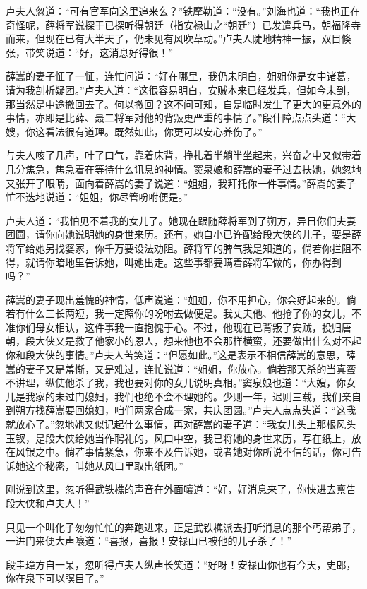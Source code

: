 \documentclass[12pt,oneside]{book}
\begin{document}
卢夫人忽道：``可有官军向这里追来么？''铁摩勒道：``没有。''刘海也道：``我也正在奇怪呢，薛将军说探于已探听得朝廷（指安禄山之``朝廷''）已发遣兵马，朝福隆寺而来，但现在已有大半天了，仍未见有风吹草动。''卢夫人陡地精神一振，双目倏张，带笑说道：``好，这消息好得很！''

薛嵩的妻子怔了一怔，连忙问道：``好在哪里，我仍未明白，姐姐你是女中诸葛，请为我剖析疑团。''卢夫人道：``这很容易明白，安贼本来已经发兵，但如今未到，那当然是中途撤回去了。何以撤回？这不问可知，自是临时发生了更大的更意外的事情，亦即是比薛、聂二将军对他的背叛更严重的事情了。''段什障点点头道：``大嫂，你这看法很有道理。既然如此，你更可以安心养伤了。''

与夫人咳了几声，叶了口气，靠着床背，挣扎着半躺半坐起来，兴奋之中又似带着几分焦急，焦急着在等待什么讯息的神情。窦泉娘和薛嵩的妻子过去扶她，她忽地又张开了眼睛，面向着薛嵩的妻子说道：``姐姐，我拜托你一件事情。''薛嵩的妻子忙不迭地说道：``姐姐，你尽管吩咐便是。''

卢夫人道：``我怕见不着我的女儿了。她现在跟随薛将军到了朔方，异日你们夫妻团圆，请你向她说明她的身世来历。还有，她自小已许配给段大侠的儿子，要是薛将军给她另找婆家，你千万要设法劝阻。薛将军的脾气我是知道的，倘若你拦阻不得，就请你暗地里告诉她，叫她出走。这些事都要瞒着薛将军做的，你办得到吗？''

薛嵩的妻子现出羞愧的神情，低声说道：``姐姐，你不用担心，你会好起来的。倘若有什么三长两短，我一定照你的吩咐去做便是。我丈夫他、他抢了你的女儿，不准你们母女相认，这件事我一直抱愧于心。不过，他现在已背叛了安贼，投归唐朝，段大侠又是救了他家小的恩人，想来他也不会那样横蛮，还要做出什么对不起你和段大侠的事情。''卢夫人苦笑道：``但愿如此。''这是表示不相信薛嵩的意思，薛嵩的妻子又是羞惭，又是难过，连忙说道：``姐姐，你放心。倘若那天杀的当真蛮不讲理，纵使他杀了我，我也要对你的女儿说明真相。''窦泉娘也道：``大嫂，你女儿是我家的未过门媳妇，我们也绝不会不理她的。少则一年，迟则三载，我们亲自到朔方找薛嵩要回媳妇，咱们两家合成一家，共庆团圆。''卢夫人点点头道：``这我就放心了。''忽地她又似记起什么事情，再对薛嵩的妻子道：``我女儿头上那根风头玉钗，是段大侠给她当作聘礼的，风口中空，我已将她的身世来历，写在纸上，放在风银之中。倘若事情紧急，你来不及告诉她，或者她对你所说不信的话，你可告诉她这个秘密，叫她从风口里取出纸团。''

刚说到这里，忽听得武铁樵的声音在外面嚷道：``好，好消息来了，你快进去禀告段大侠和卢夫人！''

只见一个叫化子匆匆忙忙的奔跑进来，正是武铁樵派去打听消息的那个丐帮弟子，一进门来便大声嚷道：``喜报，喜报！安禄山已被他的儿子杀了！''

段圭璋方自一呆，忽听得卢夫人纵声长笑道：``好呀！安禄山你也有今天，史郎，你在泉下可以瞑目了。''
\end{document}

